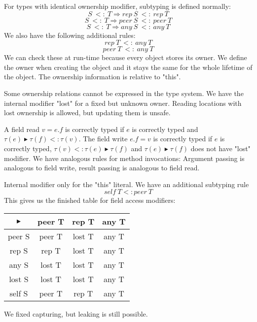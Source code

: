 \begin{mytitle} For types with identical ownership modifier, subtyping is defined normally:
$$S\ <:\ T \Rightarrow rep\ S\ <:\ rep\ T$$
$$S\ <:\ T \Rightarrow peer\ S\ <:\ peer\ T$$
$$S\ <:\ T \Rightarrow any\ S\ <:\ any\ T$$
We also have the following additional rules:
$$rep\ T\ <:\ any\ T$$
$$peer\ T\ <:\ any\ T$$
We can check these at run-time because every object stores its owner. We define the owner when creating the object and it stays the same for the whole lifetime of the object. The ownership information is relative to "this". 
\end{mytitle}
\begin{mytitle} Some ownership relations cannot be expressed in the type system. We have the internal modifier "lost" for a fixed but unknown owner. Reading locations with lost ownership is allowed, but updating them is unsafe.
\end{mytitle}
\begin{mytitle} A field read $v = e.f$ is correctly typed if $e$ is correctly typed and $\tau(e) \blacktriangleright \tau(f) <: \tau(v)$. The field write $e.f = v$ is correctly typed if $e$ is correctly typed, $\tau(v) <: \tau(e) \blacktriangleright \tau(f)$ and $\tau(e) \blacktriangleright \tau(f)$ does not have "lost" modifier. We have analogous rules for method invocations: Argument passing is analogous to field write, result passing is analogous to field read.
\end{mytitle}
\begin{mytitle} Internal modifier only for the "this" literal. We have an additional subtyping rule 
$$self\ T <: peer\ T$$
This gives us the finished table for field access modifiers:\\
\begin{center}
\begin{tabular}{c| c c c}
     $\blacktriangleright$ & peer T & rep T & any T \\
     \hline
     peer S  & peer T & lost T & any T \\
     rep S  & rep T & lost T & any T \\
     any S  & lost T & lost T & any T \\
     lost S  & lost T & lost T & any T \\
     self S  & peer T & rep T & any T \\
\end{tabular}
\end{center}
We fixed capturing, but leaking is still possible.
\end{mytitle}
